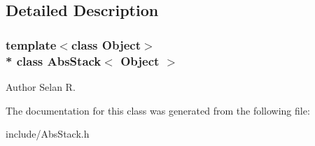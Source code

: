 \subsection{Detailed Description}
\subsubsection*{template$<$class Object$>$\\*
class Abs\+Stack$<$ Object $>$}

\begin{DoxyAuthor}{Author}
Selan R. 
\end{DoxyAuthor}


The documentation for this class was generated from the following file\+:\begin{DoxyCompactItemize}
\item 
include/Abs\+Stack.\+h\end{DoxyCompactItemize}
